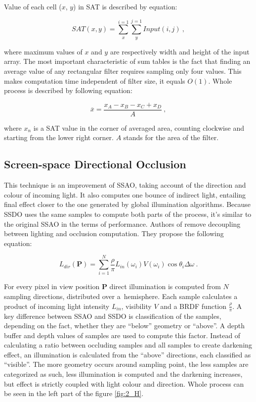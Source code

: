 \documentclass[10pt,journal,compsoc,twoside]{IEEEtran}
\begin{document}
	Value of each cell (\(x\), \(y\)) in SAT is described by equation:
	
	\begin{equation}
	\mathit{SAT}(x, y) = \sum_{x}^{i=1}\sum_{y}^{j=1}\mathit{Input}(i, j)\ ,
	\end{equation}
	
	where maximum values of \(x\) and \(y\) are respectively width and height of the input array. The most important characteristic of sum tables is the fact that finding an average value of any rectangular filter requires sampling only four values. This makes computation time independent of filter size, it equals \(O(1)\). Whole process is described by following equation:
	
	\begin{equation}
	\overline{x} = \frac{x_{A} - x_{B} - x_{C} + x_{D}}{A}\ ,
	\end{equation}
	
	where \(x_{n}\) is a SAT value in the corner of averaged area, counting clockwise and starting from the lower right corner. \(A\) stands for the area of the filter.
	
	\subsection{Screen-space Directional Occlusion}\label{t:related:ssdo}
	
	This technique is an improvement of SSAO, taking account of the direction and colour of incoming light. It also computes one bounce of indirect light, entailing final effect closer to the one generated by global illumination algorithms. Because SSDO uses the same samples to compute both parts of the process, it's similar to the original SSAO in the terms of performance. Authors of \cite{ssdo} remove decoupling between lighting and occlusion computation. They propose the following equation:
	
	\begin{equation}
	L_{dir}(\mathbf{P}) = \sum_{i=1}^{N}\frac{\rho}{\pi}L_{in}(\omega_{i})V(\omega_{i})\cos\theta_{i}\Delta\omega\ .
	\end{equation}
	
	For every pixel in view position \(\mathbf{P}\) direct illumination is computed from \(N\) sampling directions, distributed over a~hemisphere. Each sample calculates a product of incoming light intensity \(L_{in}\), visibility \(V\) and a BRDF function \(\frac{\rho}{\pi}\). A key difference between SSAO and SSDO is classification of the samples, depending on the fact, whether they are ``below'' geometry or ``above''. A depth buffer and depth values of samples are used to compute this factor. Instead of calculating a ratio between occluding samples and all samples to create darkening effect, an illumination is calculated from the ``above'' directions, each classified as ``visible''. The more geometry occurs around sampling point, the less samples are categorized as such, less illumination is computed and the darkening increases, but effect is strictly coupled with light colour and direction. Whole process can be seen in the left part of the figure \ref{fig:2_H}.
	
\end{document}

